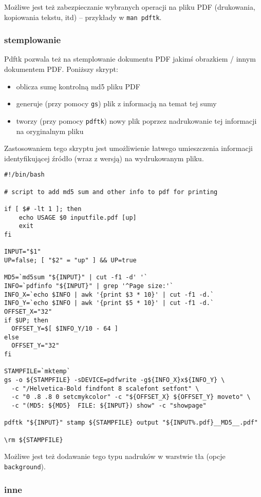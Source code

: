 \documentclass[fontSize=10pt, rmargin=3cm, extra]{pdfArticle}
\begin{document}
Możliwe jest też zabezpieczanie wybranych operacji na pliku PDF (drukowania, kopiowania tekstu, itd) – przykłady w \Verb$man pdftk$.

\subsubsection{stemplowanie}

Pdftk pozwala też na stemplowanie dokumentu PDF jakimś obrazkiem / innym dokumentem PDF. Poniższy skrypt:
\begin{itemize}
	\item oblicza sumę kontrolną md5 pliku PDF
	\item generuje (przy pomocy \Verb$gs$) plik z informacją na temat tej sumy
	\item tworzy (przy pomocy \Verb$pdftk$) nowy plik poprzez nadrukowanie tej informacji na oryginalnym pliku
\end{itemize}
Zastosowaniem tego skryptu jest umożliwienie łatwego umieszczenia informacji identyfikującej źródło (wraz z wersją) na wydrukowanym pliku.

\begin{verbatim}
#!/bin/bash

# script to add md5 sum and other info to pdf for printing

if [ $# -lt 1 ]; then
	echo USAGE $0 inputfile.pdf [up]
	exit
fi

INPUT="$1"
UP=false; [ "$2" = "up" ] && UP=true

MD5=`md5sum "${INPUT}" | cut -f1 -d' '`
INFO=`pdfinfo "${INPUT}" | grep '^Page size:'`
INFO_X=`echo $INFO | awk '{print $3 * 10}' | cut -f1 -d.`
INFO_Y=`echo $INFO | awk '{print $5 * 10}' | cut -f1 -d.`
OFFSET_X="32"
if $UP; then
  OFFSET_Y=$[ $INFO_Y/10 - 64 ]
else
  OFFSET_Y="32"
fi

STAMPFILE=`mktemp`
gs -o ${STAMPFILE} -sDEVICE=pdfwrite -g${INFO_X}x${INFO_Y} \
  -c "/Helvetica-Bold findfont 8 scalefont setfont" \
  -c "0 .8 .8 0 setcmykcolor" -c "${OFFSET_X} ${OFFSET_Y} moveto" \
  -c "(MD5: ${MD5}  FILE: ${INPUT}) show" -c "showpage"

pdftk "${INPUT}" stamp ${STAMPFILE} output "${INPUT%.pdf}__MD5__.pdf"

\rm ${STAMPFILE}
\end{verbatim}

Możliwe jest też dodawanie tego typu nadruków w warstwie tła (opcje \Verb$background$).

\subsubsection{inne}
\end{document}

